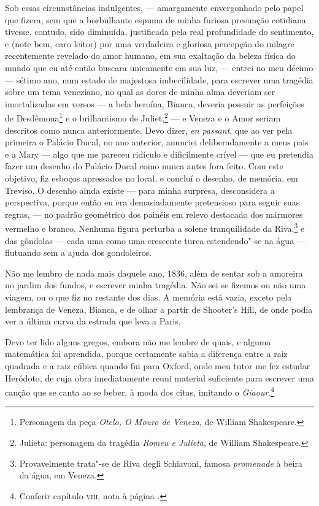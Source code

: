 Sob essas circunstâncias indulgentes, --- amargamente envergonhado
pelo papel que fizera, sem que a borbulhante espuma de minha furiosa
presunção cotidiana tivesse, contudo, sido diminuída, justificada pela
real profundidade do sentimento, e (note bem, caro leitor) por uma
verdadeira e gloriosa percepção do milagre recentemente revelado do amor
humano, em sua exaltação da beleza física do mundo que eu até então
buscara unicamente em sua luz, --- entrei no meu décimo --- sétimo ano, num
estado de majestosa imbecilidade, para escrever uma tragédia sobre um
tema veneziano, no qual as dores de minha alma deveriam ser
imortalizadas em versos --- a bela heroína, Bianca, deveria possuir as
perfeições de Desdêmona\footnote{Personagem da peça \textit{Otelo, O Mouro
  de Veneza}, de William Shakespeare.} e o brilhantismo
de Juliet,\footnote{Julieta: personagem da tragédia \textit{Romeu e
  Julieta}, de William Shakespeare.} --- e Veneza e o
Amor seriam descritos como nunca anteriormente. Devo dizer, \textit{en
passant}, que ao ver pela primeira o Palácio Ducal, no ano anterior,
anunciei deliberadamente a meus pais e a Mary --- algo que me pareceu
ridículo e dificilmente crível --- que eu pretendia fazer um desenho do
Palácio Ducal como nunca antes fora feito. Com este objetivo, fiz
esboços apressados no local, e concluí o desenho, de memória, em
Treviso. O desenho ainda existe --- para minha surpresa, desconsidera a
perspectiva, porque então eu era demasiadamente pretensioso para seguir
suas regras, --- no padrão geométrico dos painéis em relevo destacado dos
mármores vermelho e branco. Nenhuma figura perturba a solene
tranquilidade da Riva,\footnote{Provavelmente trata"-se de Riva degli
  Schiavoni, famosa \textit{promenade} à beira da água, em Veneza.} e das gôndolas --- cada uma como uma crescente turca
estendendo"-se na água --- flutuando sem a ajuda dos gondoleiros.

Não me lembro de nada mais daquele ano, 1836, além de sentar sob a
amoreira no jardim dos fundos, e escrever minha tragédia. Não sei se
fizemos ou não uma viagem, ou o que fiz no restante dos dias. A memória
está vazia, exceto pela lembrança de Veneza, Bianca, e de olhar a partir
de Shooter's Hill, de onde podia ver a última curva da estrada que leva
a Paris.

Devo ter lido alguns gregos, embora não me lembre de quais, e alguma
matemática foi aprendida, porque certamente sabia a diferença entre a
raiz quadrada e a raiz cúbica quando fui para Oxford, onde meu tutor me
fez estudar Heródoto, de cuja obra imediatamente reuni material
suficiente para escrever uma canção que se canta ao se beber, à moda dos
citas, imitando o \textit{Giaour}.\footnote{Conferir capítulo \textsc{viii}, nota
à página \pageref{giaour}.}

